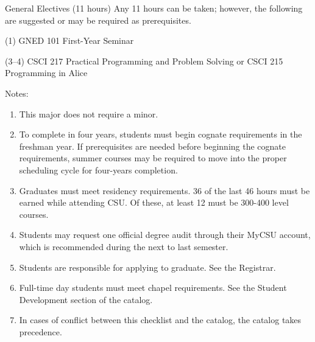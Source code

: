 \begin{reqgroup}{General Electives (11 hours)}
Any 11 hours can be taken; however, the following are suggested or may be required as prerequisites.
\begin{checklist}
\begin{minipage}[t]{\linewidth}
	\item (1)	GNED 101	First-Year Seminar
	\item (3--4)	CSCI 217	Practical Programming and Problem Solving or CSCI 215	Programming in Alice\\
	\begin{minipage}[t]{0.5\linewidth}
		\blankReq
	\end{minipage}
	\begin{minipage}[t]{0.5\linewidth}
		\blankReq
	\end{minipage}
\end{minipage}
\end{checklist}
\end{reqgroup}

Notes:%
\begin{enumerate}\footnotesize
	\item This major does not require a minor.
	\item To complete in four years, students must begin cognate requirements in the freshman year. If prerequisites are needed before beginning the cognate requirements, summer courses may be required to move into the proper scheduling cycle for four-years completion.
	\item Graduates must meet residency requirements. 36 of the last 46 hours must be earned while attending CSU. Of these, at least 12 must be 300-400 level courses.
	\item Students may request one official degree audit through their MyCSU account, which is recommended during the next to last semester.
	\item Students are responsible for applying to graduate. See the Registrar.
	\item Full-time day students must meet chapel requirements. See the Student Development section of the catalog.
	\item In cases of conflict between this checklist and the catalog, the catalog takes precedence.
\end{enumerate}
